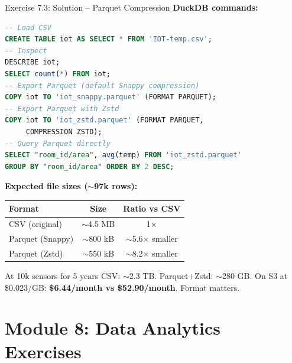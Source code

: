 \documentclass[aspectratio=169,11pt]{beamer}
\begin{document}
\begin{frame}[fragile]{Exercise 7.3: Solution -- Parquet Compression}
    \textbf{DuckDB commands:}

\begin{lstlisting}[language=SQL]
-- Load CSV
CREATE TABLE iot AS SELECT * FROM 'IOT-temp.csv';
-- Inspect
DESCRIBE iot;
SELECT count(*) FROM iot;
-- Export Parquet (default Snappy compression)
COPY iot TO 'iot_snappy.parquet' (FORMAT PARQUET);
-- Export Parquet with Zstd
COPY iot TO 'iot_zstd.parquet' (FORMAT PARQUET,
     COMPRESSION ZSTD);
-- Query Parquet directly
SELECT "room_id/area", avg(temp) FROM 'iot_zstd.parquet'
GROUP BY "room_id/area" ORDER BY 2 DESC;
\end{lstlisting}

    \vspace{0.1cm}
    \textbf{Expected file sizes ($\sim$97k rows):}
    \begin{center}
    \begin{tabular}{lcc}
        \toprule
        \textbf{Format} & \textbf{Size} & \textbf{Ratio vs CSV} \\
        \midrule
        CSV (original) & $\sim$4.5 MB & 1$\times$ \\
        Parquet (Snappy) & $\sim$800 kB & $\sim$5.6$\times$ smaller \\
        Parquet (Zstd) & $\sim$550 kB & $\sim$8.2$\times$ smaller \\
        \bottomrule
    \end{tabular}
    \end{center}

    \begin{exampleblock}{At 10k sensors for 5 years}
        CSV: $\sim$2.3 TB. Parquet+Zstd: $\sim$280 GB. On S3 at \$0.023/GB: \textbf{\$6.44/month vs \$52.90/month}. Format matters.
    \end{exampleblock}
\end{frame}

\section{Module 8: Data Analytics Exercises}
\end{document}
